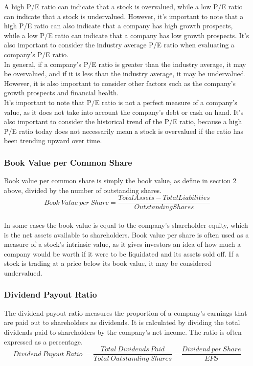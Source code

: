 \documentclass{article}
\begin{document}
A high P/E ratio can indicate that a stock is overvalued, while a low P/E ratio can indicate that a stock is undervalued. However, it's important to note that a high P/E ratio can also indicate that a company has high growth prospects, while a low P/E ratio can indicate that a company has low growth prospects. It's also important to consider the industry average P/E ratio when evaluating a company's P/E ratio.\\

In general, if a company's P/E ratio is greater than the industry average, it may be overvalued, and if it is less than the industry average, it may be undervalued. However, it is also important to consider other factors such as the company's growth prospects and financial health.\\

It's important to note that P/E ratio is not a perfect measure of a company's value, as it does not take into account the company's debt or cash on hand. It's also important to consider the historical trend of the P/E ratio, because a high P/E ratio today does not necessarily mean a stock is overvalued if the ratio has been trending upward over time.\\

\subsubsection{Book Value per Common Share}
Book value per common share is simply the book value, as define in section 2 above, divided by the number of outstanding shares. 
\begin{equation}
    Book\: Value\: per\: Share = \frac{Total Assets - Total Liabilities}{Outstanding Shares}
\end{equation}\\

In some cases the book value is equal to the company's shareholder equity, which is the net assets available to shareholders. Book value per share is often used as a measure of a stock's intrinsic value, as it gives investors an idea of how much a company would be worth if it were to be liquidated and its assets sold off. If a stock is trading at a price below its book value, it may be considered undervalued.

\subsubsection{Dividend Payout Ratio}
The dividend payout ratio measures the proportion of a company's earnings that are paid out to shareholders as dividends. It is calculated by dividing the total dividends paid to shareholders by the company's net income. The ratio is often expressed as a percentage.
\begin{equation}
    Dividend\: Payout\: Ratio\ = \frac{Total\: Dividends\: Paid}{Total\: Outstanding\: Shares} = \frac{Dividend\: per\: Share}{EPS}
\end{equation}\\
\end{document}
